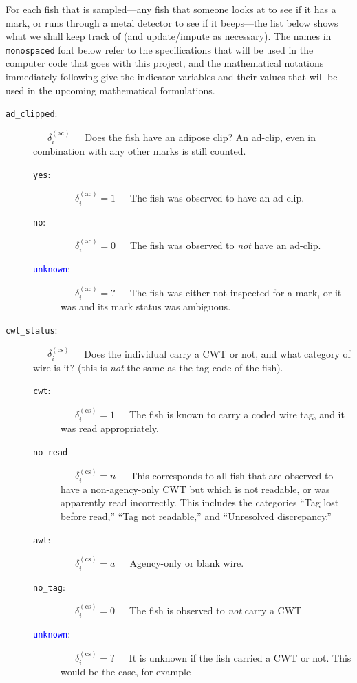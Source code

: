 \documentclass[11pt]{article}
\begin{document}
For each fish that is sampled---any fish that someone looks at to see if it has a mark, or
runs  through a metal detector to see if it beeps---the list below shows what we shall keep track of (and
update/impute as necessary).  The names in {\tt monospaced} font below refer to the specifications that
will be used in the computer code that goes with this project, and the mathematical notations immediately
following give
the indicator variables and their values that will be used in the upcoming mathematical formulations.
\begin{description}
	\item [{\tt ad\_clipped}:]  ~~~$\delta_i^{(\mathrm{ac})}$~~~Does the fish have an adipose clip? 	An ad-clip, even in combination with any other marks is still counted.
	\begin{description}
		\item [{\tt yes}:]  ~~~$\delta_i^{(\mathrm{ac})} = 1$~~~The fish was observed to have an ad-clip.
		\item [{\tt no}:]  ~~~$\delta_i^{(\mathrm{ac})} = 0$~~~The fish was observed to {\em not} have an ad-clip.
		\item [\textcolor{blue}{{\tt unknown}}:]  ~~~$\delta_i^{(\mathrm{ac})} = \mbox{?}$~~~The fish was either not
		inspected for a mark, or it was and its mark status was ambiguous.
	\end{description}
	\item [{\tt cwt\_status}:] ~~~$\delta_i^{(\mathrm{cs})}$~~~Does the individual carry a CWT or not, and what category of wire is
	it? (this is {\em not} the same as the tag code of the fish).
	\begin{description}
		\item [{\tt cwt}:] ~~~$\delta_i^{(\mathrm{cs})} = 1$~~~The fish is known to carry a coded wire tag, and it
		was read appropriately.
		\item [{\tt no\_read}] ~~~$\delta_i^{(\mathrm{cs})} = n$~~~This corresponds to all fish that
		are observed to have a non-agency-only CWT but which is not readable, or was apparently read incorrectly.  This 
		includes the categories ``Tag lost before read,'' ``Tag not readable,'' 
		and ``Unresolved discrepancy.''
		\item [{\tt awt}:] ~~~$\delta_i^{(\mathrm{cs})} = a$~~~Agency-only or blank wire.
		\item [{\tt no\_tag}:] ~~~$\delta_i^{(\mathrm{cs})} = 0$~~~The fish is observed to {\em not} carry a CWT
		\item [\textcolor{blue}{{\tt unknown}}:] ~~~$\delta_i^{(\mathrm{cs})} = \mbox{?}$~~~It is unknown if the fish carried a CWT or not.  This would be the case, for example

\end{description}
\end{description}
\end{document}
